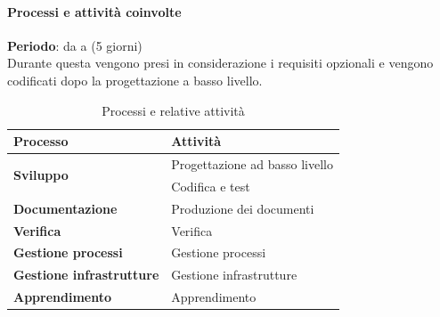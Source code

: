 		\paragraph{Processi e attività coinvolte}
			\textbf{Periodo}: da  a  (5 giorni) \\
			Durante questa  vengono presi in considerazione i requisiti opzionali e vengono codificati dopo la progettazione a basso livello.
			\begin{table}[H]
				\centering
				\begin{tabular}{ll}
					\toprule
					\textbf{Processo}                           & \textbf{Attività}              \\
					\midrule
					\multirow{2}{*}{\textbf{Sviluppo}}          & Progettazione ad basso livello \\
					& Codifica e test \\
					\midrule
					\textbf{Documentazione}            & Produzione dei documenti       \\
					\midrule
					\textbf{Verifica}                  & Verifica                       \\
					\midrule
					\textbf{Gestione processi} 					& Gestione processi              \\
					\midrule
					\textbf{Gestione infrastrutture}				& Gestione infrastrutture        \\
					\midrule
					\textbf{Apprendimento} 						& Apprendimento                 \\
					\bottomrule
				\end{tabular}
				\caption{Processi e relative attività}
				\label{Pdrop-ProcessiAttività}
			\end{table}
